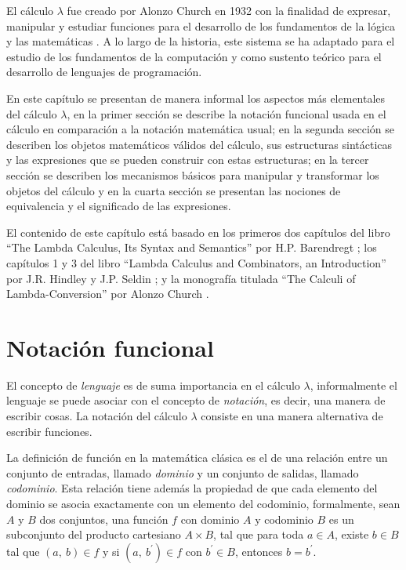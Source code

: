 El cálculo $ λ $ fue creado por Alonzo Church en 1932 con la finalidad de expresar, manipular y estudiar funciones para el desarrollo de los fundamentos de la lógica y las matemáticas \cite{Church:FoundationsLogic}. A lo largo de la historia, este sistema se ha adaptado para el estudio de los fundamentos de la computación y como sustento teórico para el desarrollo de lenguajes de programación.

En este capítulo se presentan de manera informal los aspectos más elementales del cálculo $ λ $, en la primer sección se describe la notación funcional usada en el cálculo en comparación a la notación matemática usual; en la segunda sección se describen los objetos matemáticos válidos del cálculo, sus estructuras sintácticas y las expresiones que se pueden construir con estas estructuras; en la tercer sección se describen los mecanismos básicos para manipular y transformar los objetos del cálculo y en la cuarta sección se presentan las nociones de equivalencia y el significado de las expresiones.

El contenido de este capítulo está basado en los primeros dos capítulos del libro ``The Lambda Calculus, Its Syntax and Semantics'' por H.P. Barendregt \cite{Barendregt:Bible}; los capítulos 1 y 3 del libro ``Lambda Calculus and Combinators, an Introduction'' por J.R. Hindley y J.P. Seldin \cite{HindleySeldin:LambdaCalculusAndCombinators}; y la monografía titulada ``The Calculi of Lambda-Conversion'' por Alonzo Church \cite{Church:LambdaConversion}.

\section{Notación funcional}
\label{sec:notacion-funcional}

El concepto de \emph{lenguaje} es de suma importancia en el cálculo $ λ $, informalmente el lenguaje se puede asociar con el concepto de \emph{notación}, es decir, una manera de escribir cosas. La notación del cálculo $ λ $ consiste en una manera alternativa de escribir funciones.

La definición de función en la matemática clásica es el de una relación entre un conjunto de entradas, llamado \emph{dominio} y un conjunto de salidas, llamado \emph{codominio}. Esta relación tiene además la propiedad de que cada elemento del dominio se asocia exactamente con un elemento del codominio, formalmente, sean $ A $ y $ B $ dos conjuntos, una función $ f $ con dominio $ A $ y codominio $ B $ es un subconjunto del producto cartesiano $ A \times B $, tal que para toda $ a \in A $, existe $ b \in B $ tal que $ (a,\ b) \in f $ y si $ (a,\ b^{\prime}) \in f $ con $ b^{\prime} \in B $, entonces $ b=b^{\prime} $.

